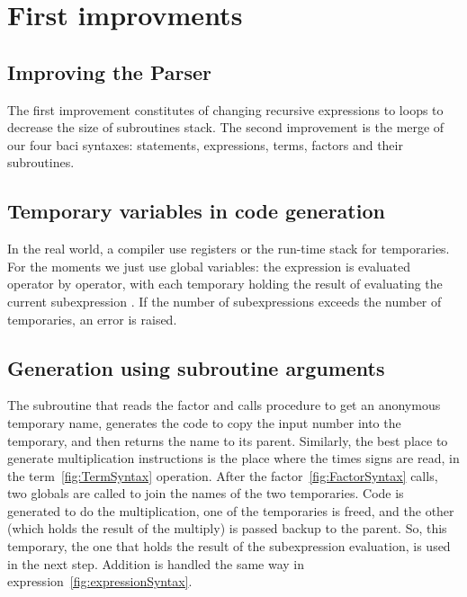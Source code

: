 \documentclass{article}
\begin{document}
        \section{First improvments}
            \subsection{Improving the Parser}
            The first improvement constitutes of changing recursive expressions to loops to decrease
            the size of subroutines stack. The second improvement is the merge of our four baci
            syntaxes: statements, expressions, terms, factors and their subroutines.

            \subsection{Temporary variables in code generation}
            In the real world, a compiler use registers or the run-time stack for temporaries. For
            the moments we just use global variables: the expression is evaluated operator by
            operator, with each temporary holding the result of evaluating the current subexpression
            . If the number of subexpressions exceeds the number of temporaries, an error is raised.

            \subsection{Generation using subroutine arguments}
            The subroutine that reads the factor and calls procedure to get an anonymous temporary
            name, generates the code to copy the input number into the temporary, and then returns
            the name to its parent. Similarly, the best place to generate multiplication
            instructions is the place where the times signs are read, in the
            term~\ref{fig:TermSyntax} operation. After the factor~\ref{fig:FactorSyntax} calls,
            two globals are called to join the names of the two temporaries. Code is generated to do
            the multiplication, one of the temporaries is freed, and the other (which holds the
            result of the multiply) is passed backup to the parent. So, this temporary, the one that
            holds the result of the subexpression evaluation, is used in the next step. Addition is
            handled the same way in expression~\ref{fig:expressionSyntax}.


\end{document}
